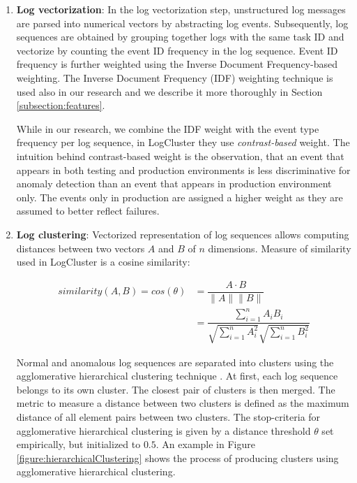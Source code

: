 \begin{enumerate}
    \item \textbf{Log vectorization}: In the log vectorization step, unstructured log messages are parsed into numerical vectors by abstracting log events. Subsequently, log sequences are obtained by grouping together logs with the same task ID and vectorize by counting the event ID frequency in the log sequence. Event ID frequency is further weighted using the Inverse Document Frequency-based weighting. The Inverse Document Frequency (IDF) weighting technique is used also in our research and we describe it more thoroughly in Section \ref{subsection:features}.
    
    While in our research, we combine the IDF weight with the event type frequency per log sequence, in LogCluster they use \textit{contrast-based} weight. The intuition behind contrast-based weight is the observation, that an event that appears in both testing and production environments is less discriminative for anomaly detection than an event that appears in production environment only. The events only in production are assigned a higher weight as they are assumed to better reflect failures. 
    
    \item \textbf{Log clustering}: Vectorized representation of log sequences allows computing distances between two vectors $A$ and $B$ of $n$ dimensions. Measure of similarity used in LogCluster is a cosine similarity:

    \begin{align*}
        similarity(A, B) = cos(\theta) &= \dfrac{A \cdot B}{\|A \| \|B\|} \\
        &= \dfrac{\sum_{i=1}^n A_i B_i}{\sqrt{\sum_{i=1}^n A_i^2} \sqrt{\sum_{i=1}^n B_i^2}}
    \end{align*}
    
    Normal and anomalous log sequences are separated into clusters using the agglomerative hierarchical clustering technique \cite{ahc1969}. At first, each log sequence belongs to its own cluster. The closest pair of clusters is then merged. The metric to measure a distance between two clusters is defined as the maximum distance of all element pairs between two clusters. The stop-criteria for agglomerative hierarchical clustering is given by a distance threshold $\theta$ set empirically, but initialized to $0.5$. An example in Figure \ref{figure:hierarchicalClustering} shows the process of producing clusters using agglomerative hierarchical clustering.
    

\end{enumerate}
